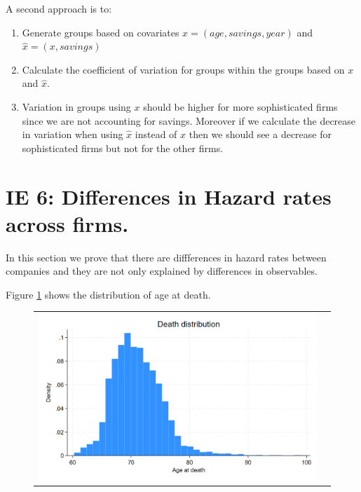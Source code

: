 \documentclass[12pt]{article}
\begin{document}
A second approach is to: 
\begin{enumerate}
    \item Generate groups based on covariates $x = (age, savings, year)$ and $\hat{x}= (x, savings)$ 
    \item Calculate the coefficient of variation for groups within the groups based on $x$ and $\hat{x}$. 
    \item Variation in groups using $x$ should be higher for more sophisticated firms since we are not accounting for savings. Moreover if we calculate the decrease in variation when using $\hat{x}$  instead of $x$ then we should see a decrease for sophisticated firms but not for the other firms. 
\end{enumerate}



\section{IE 6: Differences in Hazard rates across firms. }

In this section we prove that there are diffferences in hazard rates between companies and they are not only explained by differences in observables. 


Figure \ref{fig:ie6_1} shows the distribution of age at death. 


\begin{figure}[H]
\caption{}
\label{fig:ie6_1}
\centering{}%
\begin{tabular}{cc}
\includegraphics[scale=0.27]{../figures/IE6/IE6_hist_dies.png} 
\end{tabular}
\end{figure}
\end{document}
